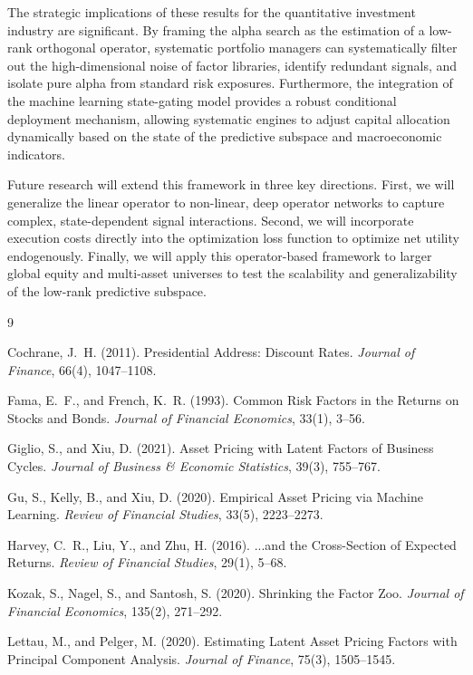 \documentclass[12pt]{article}
\begin{document}
The strategic implications of these results for the quantitative investment industry are significant. By framing the alpha search as the estimation of a low-rank orthogonal operator, systematic portfolio managers can systematically filter out the high-dimensional noise of factor libraries, identify redundant signals, and isolate pure alpha from standard risk exposures. Furthermore, the integration of the machine learning state-gating model provides a robust conditional deployment mechanism, allowing systematic engines to adjust capital allocation dynamically based on the state of the predictive subspace and macroeconomic indicators. 

Future research will extend this framework in three key directions. First, we will generalize the linear operator to non-linear, deep operator networks to capture complex, state-dependent signal interactions. Second, we will incorporate execution costs directly into the optimization loss function to optimize net utility endogenously. Finally, we will apply this operator-based framework to larger global equity and multi-asset universes to test the scalability and generalizability of the low-rank predictive subspace.

\newpage
\singlespacing
\begin{thebibliography}{9}

Cochrane, J.~H. (2011). Presidential Address: Discount Rates. \textit{Journal of Finance}, 66(4), 1047--1108.

Fama, E.~F., and French, K.~R. (1993). Common Risk Factors in the Returns on Stocks and Bonds. \textit{Journal of Financial Economics}, 33(1), 3--56.

Giglio, S., and Xiu, D. (2021). Asset Pricing with Latent Factors of Business Cycles. \textit{Journal of Business \& Economic Statistics}, 39(3), 755--767.

Gu, S., Kelly, B., and Xiu, D. (2020). Empirical Asset Pricing via Machine Learning. \textit{Review of Financial Studies}, 33(5), 2223--2273.

Harvey, C.~R., Liu, Y., and Zhu, H. (2016). ...and the Cross-Section of Expected Returns. \textit{Review of Financial Studies}, 29(1), 5--68.

Kozak, S., Nagel, S., and Santosh, S. (2020). Shrinking the Factor Zoo. \textit{Journal of Financial Economics}, 135(2), 271--292.

Lettau, M., and Pelger, M. (2020). Estimating Latent Asset Pricing Factors with Principal Component Analysis. \textit{Journal of Finance}, 75(3), 1505--1545.

\end{thebibliography}
\end{document}
